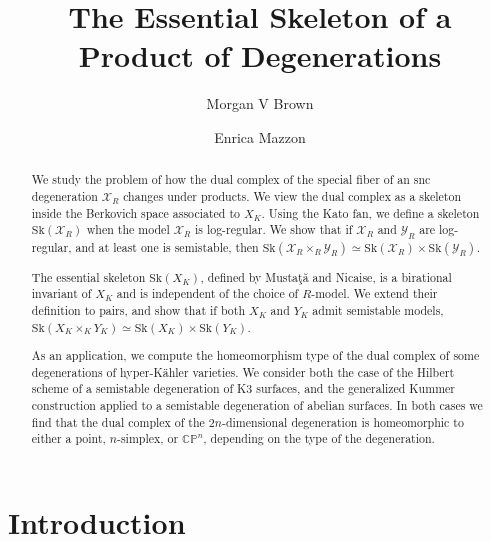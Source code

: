 \documentclass{amsart}%
\title{The Essential Skeleton of a Product of Degenerations}
\author{Morgan V Brown}
\author{Enrica Mazzon}
\date{}
\numberwithin{equation}{subsection}
\theoremstyle{plain2}
\theoremstyle{definition2}
\theoremstyle{stepstyle}
\theoremstyle{point}
\theoremstyle{subpoint}
\newcommand{\cX}{\ensuremath{\mathscr{X}}}
\newcommand{\cY}{\ensuremath{\mathscr{Y}}}
\renewcommand{\cY}{\ensuremath{\mathscr{Y}}}
\newcommand{\Hilb}{\ensuremath{\mathrm{Hilb}}}
\newcommand{\an}{\mathrm{an}}
\newcommand{\Sk}{\mathrm{Sk}}
\begin{document}
\maketitle

\begin{abstract}

We study the problem of how the dual complex of the special fiber of an snc degeneration $\cX_R$ changes under products. We view the dual complex as a skeleton inside the Berkovich space associated to $X_K$. Using the Kato fan, we define a skeleton $\Sk(\cX_R)$ when the model $\cX_R$ is log-regular. We show that if $\cX_R$ and $\cY_R$ are log-regular, and at least one is semistable, then $\Sk(\cX_R\times_R \cY_R) \simeq \Sk(\cX_R)\times \Sk(\cY_R)$. 

The essential skeleton $\Sk(X_K)$, defined by Musta\c{t}\u{a} and Nicaise, is a birational invariant of $X_K$ and is independent of the choice of $R$-model. We extend their definition to pairs, and show that if both $X_K$ and $Y_K$ admit semistable models,  $\Sk(X_K\times_K Y_K) \simeq \Sk(X_K)\times \Sk(Y_K)$. 

As an application, we compute the homeomorphism type of the dual complex of some degenerations of hyper-K{\"a}hler varieties. We consider both the case of the Hilbert scheme of a semistable degeneration of K3 surfaces, and the generalized Kummer construction applied to a semistable degeneration of abelian surfaces. In both cases we find that the dual complex of the $2n$-dimensional degeneration is homeomorphic to either a point, $n$-simplex, or $\mathbb{C}\mathbb{P}^n$, depending on the type of the degeneration.

\end{abstract}


\section{Introduction}
\end{document}
